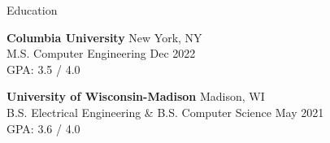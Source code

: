 \documentclass{resume} %
\begin{document}
  \newcommand\LineShrinkBeforeItem{\vspace*{-1.5em}}


  \begin{rSection}{Education}

    {\bf Columbia University} \hfill {New York, NY}\\
    M.S. Computer Engineering  \hfill {Dec 2022}\\
    GPA: 3.5 / 4.0

    {\bf University of Wisconsin-Madison} \hfill {Madison, WI}\\
    B.S. Electrical Engineering \& B.S. Computer Science  \hfill {May 2021}\\
    GPA: 3.6 / 4.0

  \end{rSection}

\end{document}
